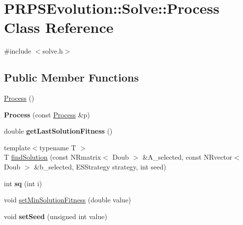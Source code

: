 \hypertarget{class_p_r_p_s_evolution_1_1_solve_1_1_process}{\section{P\-R\-P\-S\-Evolution\-:\-:Solve\-:\-:Process Class Reference}
\label{class_p_r_p_s_evolution_1_1_solve_1_1_process}
}


{\ttfamily \#include $<$solve.\-h$>$}

\subsection*{Public Member Functions}
\begin{DoxyCompactItemize}
\item 
\hyperlink{class_p_r_p_s_evolution_1_1_solve_1_1_process_a9b7073851d90e13d0604a39b7b2e87a1}{Process} ()
\item 
\hypertarget{class_p_r_p_s_evolution_1_1_solve_1_1_process_a5474f974eef2e2045a91d00bff5c61a5}{{\bfseries Process} (const \hyperlink{class_p_r_p_s_evolution_1_1_solve_1_1_process}{Process} \&p)}\label{class_p_r_p_s_evolution_1_1_solve_1_1_process_a5474f974eef2e2045a91d00bff5c61a5}

\item 
\hypertarget{class_p_r_p_s_evolution_1_1_solve_1_1_process_abaa98d7246af85e8ccbede1fcdf70006}{double {\bfseries get\-Last\-Solution\-Fitness} ()}\label{class_p_r_p_s_evolution_1_1_solve_1_1_process_abaa98d7246af85e8ccbede1fcdf70006}

\item 
{\footnotesize template$<$typename T $>$ }\\T \hyperlink{class_p_r_p_s_evolution_1_1_solve_1_1_process_a76b92308db7ff54ea49cf1ab4c501bf9}{find\-Solution} (const N\-Rmatrix$<$ Doub $>$ \&A\-\_\-selected, const N\-Rvector$<$ Doub $>$ \&b\-\_\-selected, E\-S\-Strategy strategy, int seed)
\item 
\hypertarget{class_p_r_p_s_evolution_1_1_solve_1_1_process_ab18cfd7cdb1054f6a14694881305b090}{int {\bfseries sq} (int i)}\label{class_p_r_p_s_evolution_1_1_solve_1_1_process_ab18cfd7cdb1054f6a14694881305b090}

\item 
void \hyperlink{class_p_r_p_s_evolution_1_1_solve_1_1_process_a60af419059e757412da4de63d6b408fd}{set\-Min\-Solution\-Fitness} (double value)
\item 
\hypertarget{class_p_r_p_s_evolution_1_1_solve_1_1_process_a0e1c054150e4b7c1ebdc407f57101053}{void {\bfseries set\-Seed} (unsigned int value)}\label{class_p_r_p_s_evolution_1_1_solve_1_1_process_a0e1c054150e4b7c1ebdc407f57101053}

\end{DoxyCompactItemize}


